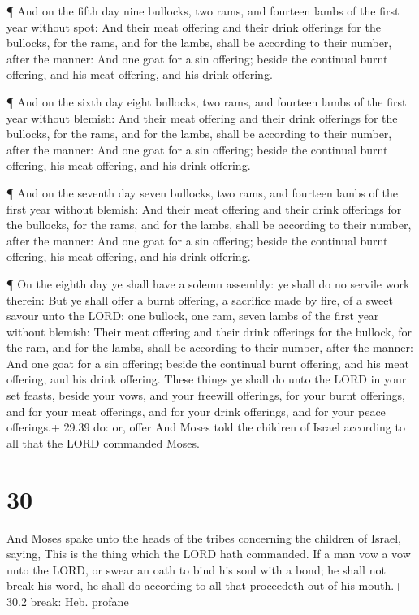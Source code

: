  ¶ And on the fifth day nine bullocks, two rams, and
fourteen lambs of the first year without spot:  And their
meat offering and their drink offerings for the bullocks, for the rams,
and for the lambs, shall be according to their number, after the manner:
 And one goat for a sin offering; beside the continual
burnt offering, and his meat offering, and his drink offering.

 ¶ And on the sixth day eight bullocks, two rams, and
fourteen lambs of the first year without blemish:  And
their meat offering and their drink offerings for the bullocks, for the
rams, and for the lambs, shall be according to their number, after the
manner:  And one goat for a sin offering; beside the
continual burnt offering, his meat offering, and his drink offering.

 ¶ And on the seventh day seven bullocks, two rams, and
fourteen lambs of the first year without blemish:  And
their meat offering and their drink offerings for the bullocks, for the
rams, and for the lambs, shall be according to their number, after the
manner:  And one goat for a sin offering; beside the
continual burnt offering, his meat offering, and his drink offering.

 ¶ On the eighth day ye shall have a solemn assembly: ye
shall do no servile work therein:  But ye shall offer a
burnt offering, a sacrifice made by fire, of a sweet savour unto the
LORD: one bullock, one ram, seven lambs of the first year without
blemish:  Their meat offering and their drink offerings for
the bullock, for the ram, and for the lambs, shall be according to their
number, after the manner:  And one goat for a sin offering;
beside the continual burnt offering, and his meat offering, and his
drink offering.  These things ye shall do unto the LORD in
your set feasts, beside your vows, and your freewill offerings, for your
burnt offerings, and for your meat offerings, and for your drink
offerings, and for your peace offerings.+ 29.39 do: or, offer
 And Moses told the children of Israel according to all
that the LORD commanded Moses.

\hypertarget{section-29}{%
\section{30}\label{section-29}}

 And Moses spake unto the heads of the tribes concerning the
children of Israel, saying, This is the thing which the LORD hath
commanded.  If a man vow a vow unto the LORD, or swear an
oath to bind his soul with a bond; he shall not break his word, he shall
do according to all that proceedeth out of his mouth.+ 30.2 break: Heb.
profane

